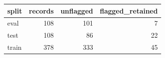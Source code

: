 \begin{tabular}{lrrr}
\toprule
split & records & unflagged & flagged\_retained \\
\midrule
eval & 108 & 101 & 7 \\
test & 108 & 86 & 22 \\
train & 378 & 333 & 45 \\
\bottomrule
\end{tabular}
